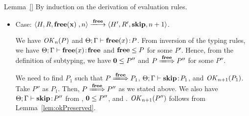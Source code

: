 \begin{pfof}{Lemma~\ref{}}
By induction on the derivation of evaluation rules.\\

\begin{itemize}
\item Case: $\langle H, R, \FREE, n \rangle \xlongrightarrow{\Free} \langle H', R', \SKIP, n + 1 \rangle $.

We have \(\mathit{OK}_n(P)\) and \(\Theta; \Gamma \vdash \mathbf{free}(x) \!:\! P\).
From inversion of the typing rules, we have \(\Theta; \Gamma \vdash
\mathbf{free}(x) \!:\! \mathbf{free}\) and \(\mathbf{free} \le P\) for some \(P'\).  Hence,
from the definition of subtyping, we have \(\mathbf{0} \le P''\) and \(P
\xLongrightarrow{\Free} P''\) for some \(P''\).

We need to find \(P_1\) such that \(P \xLongrightarrow{\Free} P_1\),
\(\Theta; \Gamma \vdash \mathbf{skip} \!:\! P_1\), and \(\mathit{OK}_{n+1}(P_1)\).
Take \(P''\) as \(P_1\).  Then, \(P \xLongrightarrow{\Free} P''\) as
we stated above.  We also have \(\Theta; \Gamma \vdash \mathbf{skip} \!:\!
P''\) from , \(\mathbf{0} \le P''\), and .
\(\mathit{OK}_{n+1}(P'')\) follows from Lemma~\ref{lem:okPreserved}.








\end{itemize}
\end{pfof}
